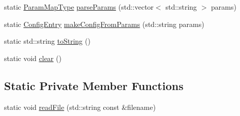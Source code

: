 \begin{DoxyCompactItemize}
static \hyperlink{structvt_1_1vrt_1_1collection_1_1balance_1_1_read_l_b_config_a539bba2e8e767f2aa9923c6616088404}{Param\+Map\+Type} \hyperlink{structvt_1_1vrt_1_1collection_1_1balance_1_1_read_l_b_config_a815d255cc8ca02dd7ead153b9dc20623}{parse\+Params} (std\+::vector$<$ std\+::string $>$ params)
\item 
static \hyperlink{structvt_1_1vrt_1_1collection_1_1balance_1_1_config_entry}{Config\+Entry} \hyperlink{structvt_1_1vrt_1_1collection_1_1balance_1_1_read_l_b_config_a4022d7aaeb1bbe556e4ed4b8630ac38b}{make\+Config\+From\+Params} (std\+::string params)
\item 
static std\+::string \hyperlink{structvt_1_1vrt_1_1collection_1_1balance_1_1_read_l_b_config_a1d4f6c45f2b4118bdffb4f0a011f25b8}{to\+String} ()
\item 
static void \hyperlink{structvt_1_1vrt_1_1collection_1_1balance_1_1_read_l_b_config_a12418b6d3b3a6e9538810bf58d570dec}{clear} ()
\end{DoxyCompactItemize}
\subsection*{Static Private Member Functions}
\begin{DoxyCompactItemize}
\item 
static void \hyperlink{structvt_1_1vrt_1_1collection_1_1balance_1_1_read_l_b_config_aab5ffc23e5bd6002ad7ea83076871df5}{read\+File} (std\+::string const \&filename)
\end{DoxyCompactItemize}
